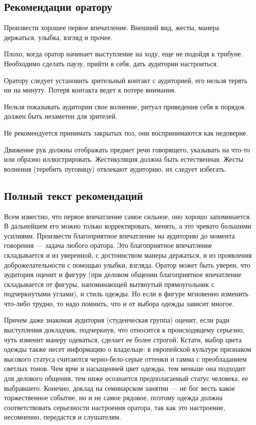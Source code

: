 \subsection*{Рекомендации оратору}
\hspace{\parindent}Произвести хорошее первое впечатление. Внешний вид, жесты, манера держаться, улыбка, взгляд и прочее.

Плохо, когда оратор начинает выступление на ходу, еще не подойдя к трибуне. Необходимо сделать паузу, прийти в себя, дать аудитории настроиться. 

Оратору следует установить зрительный контакт с аудиторией, его нельзя терять ни на минуту. Потеря контакта ведет к потере внимания.

Нельзя показывать аудитории свое волнение, ритуал приведения себя в порядок должен быть незаметен для зрителей.

Не рекомендуется принимать закрытых поз, они воспринимаются как недоверие.

Движение рук должны отображать предмет речи говорящего, указывать на что-то или образно иллюстрировать. Жестикуляция должна быть естественная. Жесты волнения (теребить пуговицу) отвлекают аудиторию, их следует избегать.
\subsection*{Полный текст рекомендаций}
\hspace{\parindent}
Всем известно, что первое впечатление самое сильное, оно хорошо запоминается. 
В дальнейшем его можно только корректировать, менять, а это чревато большими усилиями.
Произвести благоприятное впечатление на аудиторию до момента говорения — задача любого  оратора. 
Это благоприятное впечатление складывается и из уверенной, с достоинством манеры держаться, и из проявления доброжелательности с помощью улыбки, взгляда. 
Оратор может быть уверен, что аудитория оценит и фигуру (при деловом общении благоприятное впечатление складывается от фигуры, напоминающей вытянутый прямоугольник с подчеркнутыми углами), и стиль одежды. 
Но если в фигуре мгновенно изменить что-либо трудно, то надо помнить, что и от выбора одежды зависит многое. 

Причем даже знакомая аудитория (студенческая группа) оценит, если ради выступления докладчик, подчеркнув, что относится к происходящему серьезно, чуть изменит манеру одеваться, сделает ее более строгой. 
Кстати, выбор цвета одежды также несет информацию о владельце: в европейской культуре признаком высокого статуса считаются черно-бело-серые оттенки и гамма с преобладанием светлых тонов. 
Чем ярче и насыщенней цвет одежды, тем меньше она подходит для делового общения, тем ниже осознается предполагаемый статус человека, ее выбравшего. 
Конечно, доклад на семинарском занятии — не бог весть какое торжественное событие, но и не самое рядовое, поэтому одежда
должна соответствовать серьезности настроения оратора, так как это настроение, несомненно, передастся и слушателям. 

